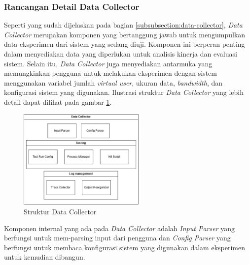 \subsubsection{Rancangan Detail Data Collector}
\label{subsubsection:detail-data-collector}

Seperti yang sudah dijelaskan pada bagian \ref{subsubsection:data-collector}, \textit{Data Collector} merupakan komponen yang bertanggung jawab untuk mengumpulkan data eksperimen dari sistem yang sedang diuji. Komponen ini berperan penting dalam menyediakan data yang diperlukan untuk analisis kinerja dan evaluasi sistem. Selain itu, \textit{Data Collector} juga menyediakan antarmuka yang memungkinkan pengguna untuk melakukan eksperimen dengan sistem menggunakan variabel jumlah \textit{virtual user}, ukuran data, \textit{bandwidth}, dan konfigurasi sistem yang digunakan. Ilustrasi struktur \textit{Data Collector} yang lebih detail dapat dilihat pada gambar \ref{fig:data-collector-structure}.

\begin{figure}[ht]
    \centering
    \includegraphics[width=0.55\textwidth]{resources/chapter-3/data-collector-architecture.png}
    \caption{Struktur Data Collector}
    \label{fig:data-collector-structure}
\end{figure}

Komponen internal yang ada pada \textit{Data Collector} adalah \textit{Input Parser} yang berfungsi untuk mem-parsing input dari pengguna dan \textit{Config Parser} yang berfungsi untuk membaca konfigurasi sistem yang digunakan dalam eksperimen untuk kemudian dibangun.